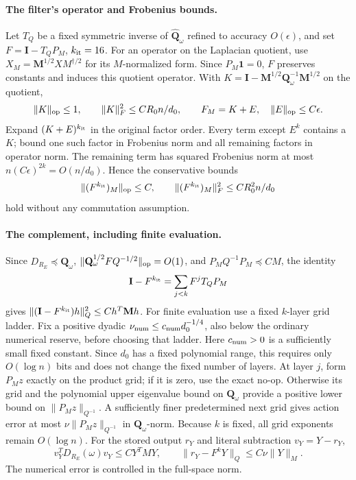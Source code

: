 \documentclass[11pt]{article}
\theoremstyle{remark}
\newcommand{\II}{\mathbf I}
\newcommand{\MM}{\mathbf M}
\newcommand{\QQ}{\mathbf Q}
\newcommand{\norm}[1]{\lVert#1\rVert}
\begin{document}
\paragraph{The filter's operator and Frobenius bounds.}
Let $T_Q$ be a fixed symmetric inverse of $\widehat{\QQ}_\omega$ refined to accuracy
$O(\epsilon)$, and set $F=\II-T_QP_M$, $k_{\rm it}=16$.
For an operator on the Laplacian quotient, use $X_M=\MM^{1/2}XM^{\dagger/2}$ for
its $M$-normalized form.
Since $P_M\mathbf1=0$, $F$ preserves constants and induces this quotient
operator.
With $K=\II-\MM^{1/2}\QQ_\omega^{-1}\MM^{1/2}$ on the quotient,
\[
 \norm{K}_{\rm op}\le1,\qquad
 \norm{K}_F^2\le CR_0 n/d_0,\qquad
 F_M=K+E,\quad \norm{E}_{\rm op}\le C\epsilon .
\]
Expand $(K+E)^{k_{\rm it}}$ in the original factor order.
Every term except $E^k$ contains a $K$; bound one such factor in Frobenius norm
and all remaining factors in operator norm.
The remaining term has squared Frobenius norm at most
$n(C\epsilon)^{2k}=O(n/d_0)$.
Hence the conservative bounds
\begin{equation}\label{eq:ram27-filter}
 \norm{(F^{k_{\rm it}})_M}_{\rm op}\le C,\qquad
 \norm{(F^{k_{\rm it}})_M}_F^2\le CR_0^2 n/d_0
\end{equation}
hold without any commutation assumption.

\paragraph{The complement, including finite evaluation.}
Since $D_{R_E}\preceq \QQ_\omega$, $\norm{\QQ_\omega^{1/2}FQ^{-1/2}}_{\rm op}=O(1)$, and
$P_MQ^{-1}P_M\preceq CM$, the identity
\[
 \II-F^{k_{\rm it}}=\sum_{j<k}F^jT_QP_M
\]
gives $\norm{(\II-F^{k_{\rm it}})h}_Q^2\le Ch^T\MM h$.
For finite evaluation use a fixed $k$-layer grid ladder.
Fix a positive dyadic $\nu_{\rm num}\le c_{\rm num}d_0^{-1/4}$, also below the ordinary
numerical reserve, before choosing that ladder.
Here $c_{\rm num}>0$ is a sufficiently small fixed constant.
Since $d_0$ has a fixed polynomial range, this requires only $O(\log n)$ bits
and does not change the fixed number of layers.
At layer $j$, form $P_Mz$ exactly on the product grid; if it is zero, use the
exact no-op.
Otherwise its grid and the polynomial upper eigenvalue bound on $\QQ_\omega$ provide a
positive lower bound on $\norm{P_Mz}_{Q^{-1}}$.
A sufficiently finer predetermined next grid gives action error at most
$\nu\norm{P_Mz}_{Q^{-1}}$ in $\QQ_\omega$-norm.
Because $k$ is fixed, all grid exponents remain $O(\log n)$.
For the stored output $r_Y$ and literal subtraction $v_Y=Y-r_Y$,
\begin{equation}\label{eq:ram27-complement}
 v_Y^TD_{R_E}(\omega)v_Y\le C Y^TMY,\qquad
 \norm{r_Y-F^kY}_Q\le C\nu\norm{Y}_M .
\end{equation}
The numerical error is controlled in the full-space norm.
\end{document}
